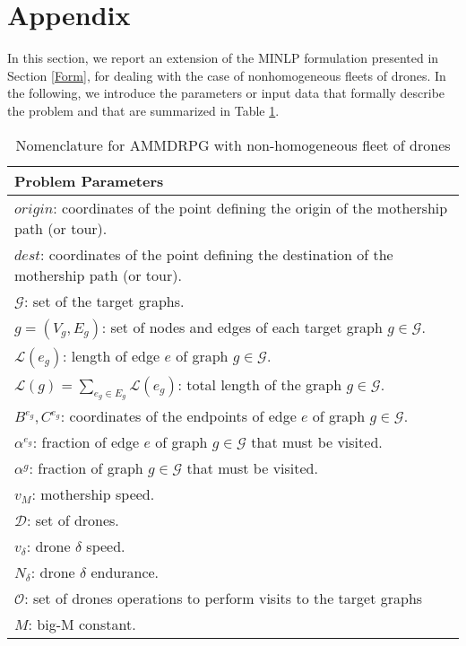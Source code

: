 \section{Appendix}\label{App}
\noindent
In this section, we report an extension of the MINLP formulation presented in Section \ref{Form}, for dealing with the case of nonhomogeneous fleets of drones.
\noindent
In the following, we introduce the parameters or input data that formally describe the problem and that are summarized in Table \ref{table:At1}.
\noindent
{}

\begin{table}[!h]
\scriptsize
\centering
\begin{tabular}{ | l | }
\hline
\textbf{Problem Parameters}\\
\hline
$origin$: coordinates of the point defining the origin of the mothership path (or tour).\\
$dest$: coordinates of the point defining the destination of the mothership path (or tour).\\
$\mathcal{G}$: set of the target graphs.\\
$g = (V_g, E_g)$: set of nodes and edges of each target graph $g \in \mathcal{G}$.\\
$\mathcal{L}(e_g)$: length of edge $e$ of graph $g \in \mathcal{G}$.\\
$\mathcal{L}(g)=\sum_{e_g\in E_g} \mathcal L(e_g)$: total length of the graph $g\in\mathcal G$.\\
$B^{e_g}, C^{e_g}$: coordinates of the endpoints of edge $e$ of graph $g \in \mathcal{G}$.\\
$\alpha^{e_g}$: fraction of edge $e$ of graph $g \in \mathcal{G}$ that must be visited.\\
$\alpha^{g}$: fraction of graph $g \in \mathcal{G}$ that must be visited.\\
$v_M$: mothership speed.\\
$\mathcal D$: set of drones.\\
$v_\delta$: drone $\delta$ speed.\\
$N_\delta$: drone $\delta$ endurance. \\
$\mathcal{O}$: set of drones operations to perform visits to the target graphs\\
$M$: big-M constant.\\
\hline
\end{tabular}
\caption{Nomenclature for AMMDRPG with non-homogeneous fleet of drones}
\label{table:At1}
\end{table}

